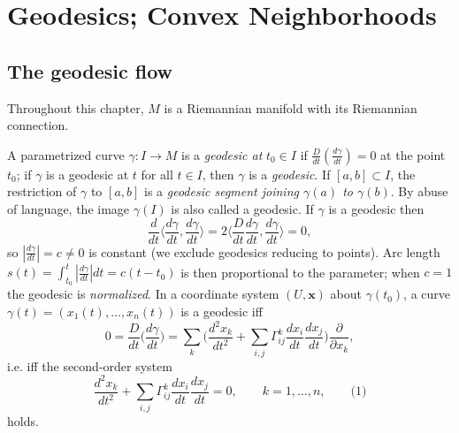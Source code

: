 \chapter{Geodesics; Convex Neighborhoods}
\label{chap:dc-geodesics-convex-neighborhoods}

\section{The geodesic flow}

Throughout this chapter, $M$ is a Riemannian manifold with its Riemannian
connection.

\begin{definition}[geodesic]
  \label{def:dc-ch3-2-1}
  \leanok
  A parametrized curve $\gamma:I\to M$ is a \emph{geodesic at} $t_0\in I$ if
  $\frac{D}{dt}\left(\frac{d\gamma}{dt}\right)=0$ at the point $t_0$; if $\gamma$ is
  a geodesic at $t$ for all $t\in I$, then $\gamma$ is a \emph{geodesic}. If
  $[a,b]\subset I$, the restriction of $\gamma$ to $[a,b]$ is a \emph{geodesic segment joining $\gamma(a)$ to $\gamma(b)$}. By abuse of language, the image $\gamma(I)$
  is also called a geodesic.
  If $\gamma$ is a geodesic then
  $$
  \frac{d}{dt}\Big\langle\frac{d\gamma}{dt},\frac{d\gamma}{dt}\Big\rangle=2\Big\langle\frac{D}{dt}\frac{d\gamma}{dt},\frac{d\gamma}{dt}\Big\rangle=0,
  $$
  so $\left|\frac{d\gamma}{dt}\right|=c\neq 0$ is constant (we exclude geodesics
  reducing to points). Arc length $s(t)=\int_{t_0}^t\left|\frac{d\gamma}{dt}\right|dt=c(t-t_0)$
  is then proportional to the parameter; when $c=1$ the geodesic is \emph{normalized}.
  In a coordinate system $(U,\mathbf{x})$ about $\gamma(t_0)$, a curve
  $\gamma(t)=(x_1(t),\dots,x_n(t))$ is a geodesic iff
  $$
  0=\frac{D}{dt}\Big(\frac{d\gamma}{dt}\Big)=\sum_k\Big(\frac{d^2x_k}{dt^2}+\sum_{i,j}\Gamma_{ij}^k\frac{dx_i}{dt}\frac{dx_j}{dt}\Big)\frac{\partial}{\partial x_k},
  $$
  i.e. iff the second-order system
  $$
  \frac{d^2x_k}{dt^2}+\sum_{i,j}\Gamma_{ij}^k\frac{dx_i}{dt}\frac{dx_j}{dt}=0,\qquad k=1,\dots,n,\qquad\text{(1)}
  $$
  holds.

\end{definition}

